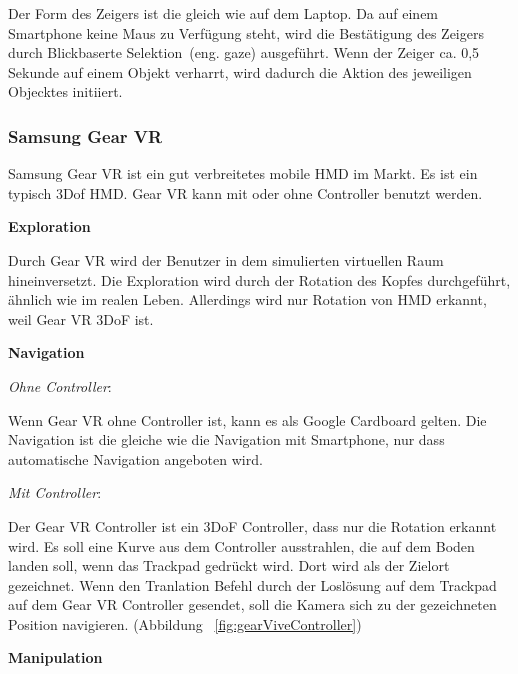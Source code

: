   \noindent
  Der Form des Zeigers ist die gleich wie auf dem Laptop. Da auf einem Smartphone keine Maus zu Verfügung steht, wird die Bestätigung des Zeigers durch \glqq Blickbaserte Selektion\grqq\ (eng. gaze) ausgeführt. Wenn der Zeiger ca. 0,5 Sekunde auf einem Objekt verharrt, wird dadurch die Aktion des jeweiligen Objecktes initiiert.
  
 \subsubsection{Samsung Gear VR}
 Samsung Gear VR ist ein gut verbreitetes mobile HMD im Markt. Es ist ein typisch 3Dof HMD. Gear VR kann mit oder ohne Controller benutzt werden.
 
  \vspace{1em}
  \noindent
  \textbf{Exploration}
  \vspace{1em}
  
  \noindent
  Durch Gear VR wird der Benutzer in dem simulierten virtuellen Raum hineinversetzt. Die Exploration wird durch der Rotation des Kopfes durchgeführt, ähnlich wie im realen Leben. Allerdings wird nur Rotation von HMD erkannt, weil Gear VR 3DoF ist.
  
  \vspace{1em}
  \noindent
  \textbf{Navigation}
  \vspace{1em}
  
  \noindent
  \textsl{Ohne Controller}:
  \vspace{0.5em}
  
  \noindent
  Wenn Gear VR ohne Controller ist, kann es als Google Cardboard gelten. Die Navigation ist die gleiche wie die Navigation mit Smartphone, nur dass automatische Navigation angeboten wird.
 
  \vspace{0.5em}
  \noindent
  \textsl{Mit Controller}:
  \vspace{0.5em}
  
  \noindent
  Der Gear VR Controller ist ein 3DoF Controller, dass nur die Rotation erkannt wird. Es soll eine Kurve aus dem Controller ausstrahlen, die auf dem Boden landen soll, wenn das Trackpad gedrückt wird. Dort wird als der Zielort gezeichnet. Wenn den Tranlation Befehl durch der Loslösung auf dem Trackpad auf dem Gear VR Controller gesendet, soll die Kamera sich zu der gezeichneten Position navigieren. (Abbildung ~\ref{fig:gearViveController})

  \vspace{1em}
  \noindent
  \textbf{Manipulation}
  \vspace{1em}
  
